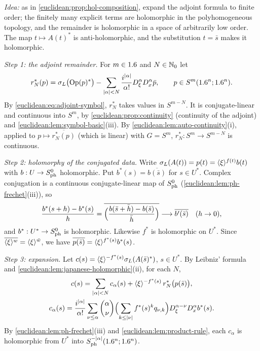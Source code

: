\subsection*{}

\emph{Idea:} as in \cref{euclidean:prop:hol-composition}, expand the adjoint formula to
finite order; the finitely many explicit terms are holomorphic in the polyhomogeneous
topology, and the remainder is holomorphic in a space of arbitrarily low order. The map
$t\mapsto A(t)^*$ is anti-holomorphic, and the substitution $t=\bar s$ makes it
holomorphic.

\emph{Step 1: the adjoint remainder.} For $m\in1.6$ and $N\in\mathbb{N}_0$ let
\begin{equation*}
  r^*_N(p)=\sigma_L\bigl(\operatorname{Op}(p)^*\bigr)-\sum_{\lvert \alpha\rvert<N}\frac{i^{\lvert \alpha\rvert}}{\alpha!}
  D^\alpha_\xi D^\alpha_x\bar p,\qquad p\in S^m(1.6^n;1.6^n).
\end{equation*}
By \eqref{euclidean:eq:adjoint-symbol}, $r^*_N$ takes values in $S^{m-N}$. It is
conjugate-linear and continuous into $S^m$, by \cref{euclidean:prop:continuity} (continuity
of the adjoint) and \cref{euclidean:lem:symbol-basic}(iii). By
\cref{euclidean:lem:auto-continuity}(i), applied to $p\mapsto\overline{r^*_N(p)}$ (which is
linear) with $G=S^m$, $r^*_N:S^m\to S^{m-N}$ is continuous.

\emph{Step 2: holomorphy of the conjugated data.} Write
$\sigma_L(A(t))=p(t)=\langle \xi\rangle^{f(t)}b(t)$ with $b:U\to S^{0}_{\mathrm{ph}}$ holomorphic. Put
$b^*(s)=\overline{b(\bar s)}$ for $s\in U^*$. Complex conjugation is a continuous
conjugate-linear map of $S^{0}_{\mathrm{ph}}$ (\cref{euclidean:lem:ph-frechet}(iii)), so
\begin{equation*}
  \frac{b^*(s+h)-b^*(s)}h=\overline{\Bigl(\frac{b(\bar s+\bar h)-b(\bar s)}{\bar h}\Bigr)}
  \longrightarrow\overline{b'(\bar s)}\quad(h\to0),
\end{equation*}
and $b^*:U^*\to S^{0}_{\mathrm{ph}}$ is holomorphic. Likewise $f^*$ is holomorphic on $U^*$. Since
$\overline{\langle \xi\rangle^w}=\langle \xi\rangle^{\bar w}$, we have
$\overline{p(\bar s)}=\langle \xi\rangle^{f^*(s)}b^*(s)$.

\emph{Step 3: expansion.} Let
$c(s)=\langle \xi\rangle^{-f^*(s)}\sigma_L(A(\bar s)^*)$, $s\in U^*$. By Leibniz' formula and
\cref{euclidean:lem:japanese-holomorphic}(ii), for each $N$,
\begin{gather*}
  c(s)=\sum_{\lvert \alpha\rvert<N}c_\alpha(s)+\langle \xi\rangle^{-f^*(s)}\,r^*_N\bigl(p(\bar s)\bigr),\\
  c_\alpha(s)=\frac{i^{\lvert \alpha\rvert}}{\alpha!}\sum_{\nu\le\alpha}\binom\alpha\nu
  \Bigl(\sum_{k\le\lvert \nu\rvert}f^*(s)^kq_{\nu,k}\Bigr)D^{\alpha-\nu}_\xi D^\alpha_xb^*(s).
\end{gather*}
By \cref{euclidean:lem:ph-frechet}(iii) and \cref{euclidean:lem:product-rule}, each $c_\alpha$
is holomorphic from $U^*$ into $S^{-\lvert \alpha\rvert}_{\mathrm{ph}}(1.6^n;1.6^n)$.

